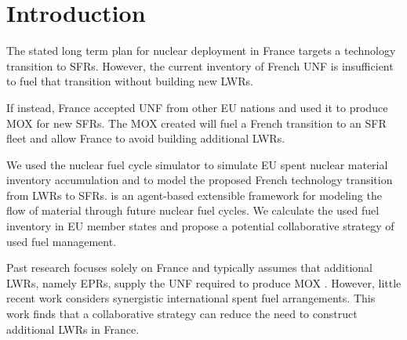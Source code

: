 
\section{Introduction}
The stated long term plan for nuclear deployment in France targets a technology 
transition to \glspl{SFR}. However, the current inventory of French \gls{UNF} 
is insufficient to fuel that transition without building new \glspl{LWR}.

If instead, France accepted 
\gls{UNF} from other \gls{EU} nations and used it to produce \gls{MOX} for new \glspl{SFR}.
The \gls{MOX} created will fuel a French transition to an \gls{SFR} fleet
and allow France to avoid building additional \glspl{LWR}.


We used the \Cyclus nuclear fuel cycle simulator \cite{huff_fundamental_2016} to simulate
 \gls{EU} spent nuclear material inventory accumulation and to model the 
 proposed French 
 technology transition from \glspl{LWR} to
 \glspl{SFR}. \Cyclus is an agent-based extensible
framework for modeling the flow of material through future nuclear fuel cycles.
We calculate the used fuel
inventory in \gls{EU} member states and propose a potential collaborative
strategy of used fuel management.


Past research focuses solely on France and typically assumes that additional \glspl{LWR},
namely \glspl{EPR}, supply the \gls{UNF} required to produce \gls{MOX} \cite{carre_overview_2009, martin_symbiotic_2017, freynet_multiobjective_2016}.
However, little recent work considers synergistic international spent fuel arrangements.
This work finds that a collaborative strategy can reduce the
need to construct additional \glspl{LWR} in France.

